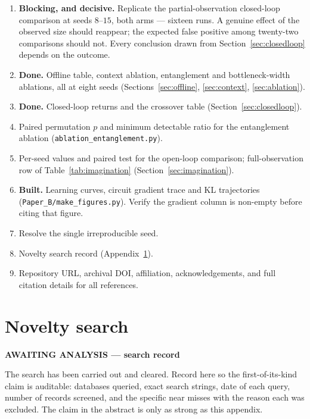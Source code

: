 \documentclass[11pt,onecolumn]{article}
\newif\ifdraft
\newenvironment{pendingbox}[1]
  {\par\vspace{3pt}\noindent
   \begin{lrbox}{\pendbox}\begin{minipage}{0.93\linewidth}\small
   \textcolor{PendFG}{\textbf{AWAITING ANALYSIS --- #1}}\par\vspace{3pt}
   \color{PendFG}}
  {\end{minipage}\end{lrbox}%
   \ifdraft\fcolorbox{PendFG}{PendBG}{\usebox{\pendbox}}\fi
   \par\vspace{4pt}}
\begin{document}
\begin{enumerate}\itemsep3pt
\item \textbf{Blocking, and decisive.} Replicate the
      partial-observation closed-loop comparison at seeds $8$--$15$,
      both arms --- sixteen runs. A genuine effect of the observed size
      should reappear; the expected false positive among twenty-two
      comparisons should not. Every conclusion drawn from
      Section~\ref{sec:closedloop} depends on the outcome.
\item \textbf{Done.} Offline table, context ablation, entanglement and
      bottleneck-width ablations, all at eight seeds
      (Sections~\ref{sec:offline}, \ref{sec:context},
      \ref{sec:ablation}).
\item \textbf{Done.} Closed-loop returns and the crossover table
      (Section~\ref{sec:closedloop}).
\item Paired permutation $p$ and minimum detectable ratio for the
      entanglement ablation
      (\texttt{ablation\_entanglement.py}).
\item Per-seed values and paired test for the open-loop comparison;
      full-observation row of Table~\ref{tab:imagination}
      (Section~\ref{sec:imagination}).
\item \textbf{Built.} Learning curves, circuit gradient trace and
      KL trajectories (\texttt{Paper\_B/make\_figures.py}). Verify the
      gradient column is non-empty before citing that figure.
\item Resolve the single irreproducible seed.
\item Novelty search record (Appendix~\ref{app:novelty}).
\item Repository URL, archival DOI, affiliation, acknowledgements, and
      full citation details for all references.
\end{enumerate}

\section{Novelty search}\label{app:novelty}
\begin{pendingbox}{search record}
The search has been carried out and cleared. Record here so the
first-of-its-kind claim is auditable: databases queried, exact search
strings, date of each query, number of records screened, and the
specific near misses with the reason each was excluded. The claim in the
abstract is only as strong as this appendix.
\end{pendingbox}
\end{document}
